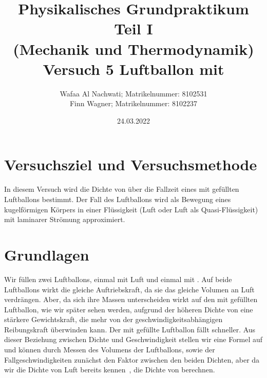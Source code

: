 \documentclass{article}
\date{24.03.2022}
\title{Physikalisches Grundpraktikum Teil I \\ (Mechanik und Thermodynamik) \\ Versuch 5 Luftballon mit \ce{CO2}}
\author{Wafaa Al Nachwati; Matrikelnummer: 8102531 \\ Finn Wagner; Matrikelnummer: 8102237}
\begin{document}
    \maketitle

    \section{Versuchsziel und Versuchsmethode}
      In diesem Versuch wird die Dichte von  über die Fallzeit eines mit  gefüllten Luftballons bestimmt.
      Der Fall des Luftballons wird als Bewegung eines kugelförmigen Körpers in einer Flüssigkeit (Luft oder Luft als Quasi-Flüssigkeit) mit laminarer Strömung approximiert.

    \section{Grundlagen}
      Wir füllen zwei Luftballons, einmal mit Luft und einmal mit . Auf beide Luftballons wirkt die gleiche Auftriebskraft, da sie das gleiche Volumen an Luft verdrängen.
      Aber, da sich ihre Massen unterscheiden wirkt auf den mit  gefüllten Luftballon, wie wir später sehen werden, aufgrund der höheren Dichte von 
      eine stärkere Gewichtskraft, die mehr von der geschwindigkeitsabhängigen Reibungskraft überwinden kann. Der mit  gefüllte Luftballon fällt schneller.
      Aus dieser Beziehung zwischen Dichte und Geschwindigkeit stellen wir eine Formel auf und können durch Messen des Volumens der Luftballons, sowie der Fallgeschwindigkeiten
      zunächst den Faktor zwischen den beiden Dichten, aber da wir die Dichte von Luft bereits kennen~\cite{Aufgabenstellung}, die Dichte von  berechnen.
\end{document}
